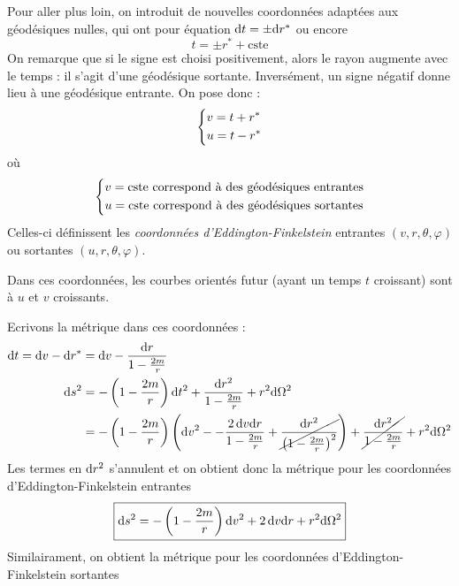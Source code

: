 Pour aller plus loin, on introduit de nouvelles coordonnées adaptées aux géodésiques nulles, qui ont pour équation $\mathrm{d} t = \pm \mathrm{d} r^*$ ou encore
\begin{equation}
    t = \pm r^* + \text{cste}
\end{equation}
On remarque que si le signe est choisi positivement, alors le rayon augmente avec le temps : il s'agit d'une géodésique sortante. Inversément, un signe négatif donne lieu à une géodésique entrante. On pose donc :
\begin{equation}
    \begin{dcases}
        v = t + r^* \\
        u = t - r^*
    \end{dcases}
\end{equation}
où
\begin{equation}
    \begin{dcases}
        v = \text{cste correspond à des géodésiques entrantes}\\
        u = \text{cste correspond à des géodésiques sortantes}
    \end{dcases}
\end{equation}
Celles-ci définissent les \emph{coordonnées d'Eddington-Finkelstein} entrantes $(v,r,\theta,\varphi)$ ou sortantes $(u,r,\theta,\varphi)$.
\begin{rmk}
    Dans ces coordonnées, les courbes orientés futur (ayant un temps $t$ croissant) sont à $u$ et $v$ croissants.
\end{rmk}
Ecrivons la métrique dans ces coordonnées :
\begin{align}
    \mathrm{d} t = \mathrm{d} v - \mathrm{d} r^*& = \mathrm{d} v - \frac{\mathrm{d} r}{1 - \frac{2m}{r}}\\
    \mathrm{d} s^2 &= - \left( 1 - \frac{2m}{r} \right) \mathrm{d} t^2 + \frac{\mathrm{d} r^2}{1 -\frac{2m}{r}} +r^2\mathrm{d} \Omega^2\\
    & = - \left( 1 - \frac{2m}{r} \right) \left( \mathrm{d} v^2 - - \frac{2 \, \mathrm{d} v \mathrm{d} r}{1 - \frac{2m}{r}} + \cancel{\frac{\mathrm{d} r^2}{\left( 1 - \frac{2m}{r} \right)^2}} \right) + \cancel{\frac{\mathrm{d} r^2}{1 - \frac{2m}{r}}} + r^2 \mathrm{d} \Omega^2
\end{align}
Les termes en $\mathrm{d} r^2$ s'annulent et on obtient donc la métrique pour les coordonnées d'Eddington-Finkelstein entrantes
\begin{equation}
    \label{métrique EF entrant}
    \boxed{\mathrm{d} s^2  = - \left( 1 - \frac{2m}{r} \right) \mathrm{d} v^2 + 2 \, \mathrm{d} v \mathrm{d} r + r^2 \mathrm{d} \Omega^2}
\end{equation}
Similairament, on obtient la métrique pour les coordonnées d'Eddington-Finkelstein sortantes
